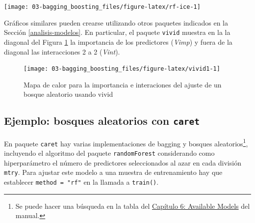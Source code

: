 \documentclass[
  spanish,
]{book}
\newenvironment{Shaded}{\begin{snugshade}}{\end{snugshade}}
\newcommand{\DataTypeTok}[1]{\textcolor[rgb]{0.13,0.29,0.53}{#1}}
\newcommand{\DecValTok}[1]{\textcolor[rgb]{0.00,0.00,0.81}{#1}}
\newcommand{\KeywordTok}[1]{\textcolor[rgb]{0.13,0.29,0.53}{\textbf{#1}}}
\newcommand{\NormalTok}[1]{#1}
\newcommand{\OperatorTok}[1]{\textcolor[rgb]{0.81,0.36,0.00}{\textbf{#1}}}
\newcommand{\StringTok}[1]{\textcolor[rgb]{0.31,0.60,0.02}{#1}}
\theoremstyle{break}
\theoremstyle{definition}
\theoremstyle{definition}
\theoremstyle{definition}
\theoremstyle{remark}
\begin{document}
\begin{center}\texttt{[image: 03-bagging\_boosting\_files/figure-latex/rf-ice-1]} \end{center}

Gráficos similares pueden crearse utilizando otros paquetes indicados en la Sección \ref{analisis-modelos}. En particular, el paquete \texttt{vivid} muestra en la la diagonal del Figura \ref{fig:vivid1} la importancia de los predictores (\emph{Vimp}) y fuera de la diagonal las interacciones 2 a 2 (\emph{Vint}).

\begin{Shaded}
\end{Shaded}

\begin{figure}[!htb]

{\centering \texttt{[image: 03-bagging\_boosting\_files/figure-latex/vivid1-1]} 

}

\caption{Mapa de calor para la importancia e interaciones del ajuste de un bosque aleatorio usando vivid}\label{fig:vivid1}
\end{figure}

\hypertarget{ejemplo-bosques-aleatorios-con-caret}{%
\subsection{\texorpdfstring{Ejemplo: bosques aleatorios con \texttt{caret}}{Ejemplo: bosques aleatorios con caret}}\label{ejemplo-bosques-aleatorios-con-caret}}

En paquete \texttt{caret} hay varias implementaciones de bagging y bosques aleatorios\footnote{Se puede hacer una búsqueda en la tabla del \href{https://topepo.github.io/caret/available-models.html}{Capítulo 6: Available Models} del manual.}, incluyendo el algoritmo del paquete \texttt{randomForest} considerando como hiperparámetro el número de predictores seleccionados al azar en cada división \texttt{mtry}.
Para ajustar este modelo a una muestra de entrenamiento hay que establecer \texttt{method\ =\ "rf"} en la llamada a \texttt{train()}.
\end{document}
